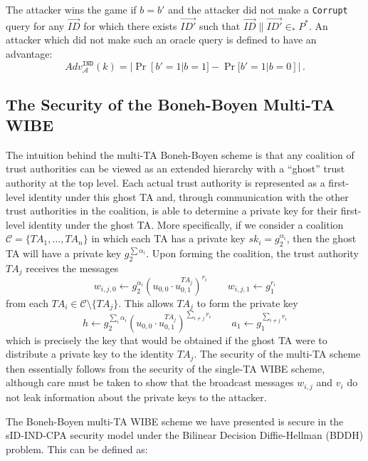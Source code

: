 \documentclass{IEEEtran}
\newcommand{\A}{\mathcal{A}}
\newcommand{\C}{\mathcal{C}}
\newcommand{\ID}{\mathit{ID}}
\newcommand{\TA}{\mathit{TA}}
\newcommand{\sk}{\mathit{sk}}
\newcommand{\adv}[2]{\mathit{Adv}_{#1}^{\texttt{#2}}}
\begin{document}
The attacker wins the game if $b=b'$ and the attacker did not make a
\texttt{Corrupt} query for any $\vec{\ID}$ for which there
exists $\vec{\ID'}$ such that $\vec{\ID}\|\vec{\ID'} \in_{*} P^{*}$.
An attacker which did not make such an oracle query is defined to
have an advantage:
\begin{displaymath}
    \adv{\A}{IND}(k) = |\Pr[b'=1|b=1]-\Pr[b'=1|b=0]| \, .
\end{displaymath}

\subsection{The Security of the Boneh-Boyen Multi-TA WIBE}

The intuition behind the multi-TA Boneh-Boyen scheme is that any
coalition of trust authorities can be viewed as an extended
hierarchy with a ``ghost'' trust authority at the top level. Each
actual trust authority is represented as a first-level identity
under this ghost TA and, through communication with the other trust
authorities in the coalition, is able to determine a private key for
their first-level identity under the ghost TA. More specifically, if
we consider a coalition $\C = \{ \TA_{1},\ldots,\TA_{n}\}$ in which
each TA has a private key $\sk_{i} = g_{2}^{\alpha_{i}}$, then the
ghost TA will have a private key $g_{2}^{\sum \alpha_{i}}$. Upon
forming the coalition, the trust authority $\TA_{j}$ receives the
messages
\begin{displaymath}
w_{i,j,0} \gets g_{2}^{\alpha_{i}} (u_{0,0} \cdot
u_{0,1}^{\TA_{j}})^{r_{i}} \qquad w_{i,j,1} \gets g_{1}^{r_{i}}
\end{displaymath}
from each $\TA_{i} \in \C \setminus \{TA_{j}\}$. This allows
$\TA_{j}$ to form the private key
\begin{displaymath}
h \gets g_{2}^{\sum_{i} \alpha_{i}} (u_{0,0} \cdot
u_{0,1}^{\TA_{j}})^{\sum_{i\neq j} r_{i}} \qquad a_{1} \gets
g_{1}^{\sum_{i\neq j} r_{i}}
\end{displaymath}
which is precisely the key that would be obtained if the ghost TA
were to distribute a private key to the identity $\TA_{j}$. The
security of the multi-TA scheme then essentially follows from the
security of the single-TA WIBE scheme, although care must be taken
to show that the broadcast messages $w_{i,j}$ and $v_{i}$ do not
leak information about the private keys to the attacker.

The Boneh-Boyen multi-TA WIBE scheme we have presented is secure in
the sID-IND-CPA security model under the Bilinear Decision
Diffie-Hellman (BDDH) problem. This can be defined as:\smallskip
\end{document}
